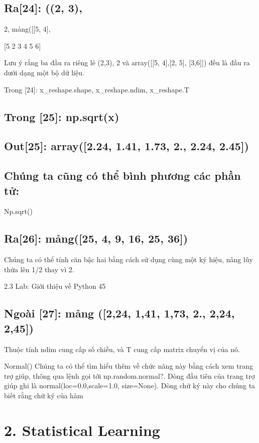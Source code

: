 \subsection{Ra[24]: ((2, 3),}

2, mảng([[5, 4],

[5 2 3 4 5 6]

Lưu ý rằng ba đầu ra riêng lẻ (2,3), 2 và array([[5, 4],[2, 5], [3,6]]) đều là đầu ra dưới dạng một bộ dữ liệu.

Trong [24]: x\_reshape.shape, x\_reshape.ndim, x\_reshape.T

\subsection{Trong [25]: np.sqrt(x)}

\subsection{Out[25]: array([2.24, 1.41, 1.73, 2., 2.24, 2.45])}

\subsection{Chúng ta cũng có thể bình phương các phần tử:}

Np.sqrt()

\subsection{Ra[26]: mảng([25, 4, 9, 16, 25, 36])}

Chúng ta có thể tính căn bậc hai bằng cách sử dụng cùng một ký hiệu, nâng lũy ​​thừa lên 1/2 thay vì 2.

2.3 Lab: Giới thiệu về Python 45

\subsection{Ngoài [27]: mảng ([2,24, 1,41, 1,73, 2., 2,24, 2,45])}

Thuộc tính ndim cung cấp số chiều, và T cung cấp matrix chuyển vị của nó.

Normal() Chúng ta có thể tìm hiểu thêm về chức năng này bằng cách xem trang trợ giúp, thông qua lệnh gọi tới np.random.normal?. Dòng đầu tiên của trang trợ giúp ghi là normal(loc=0.0,scale=1.0, size=None). Dòng chữ ký này cho chúng ta biết rằng chữ ký của hàm

\section{2. Statistical Learning}

